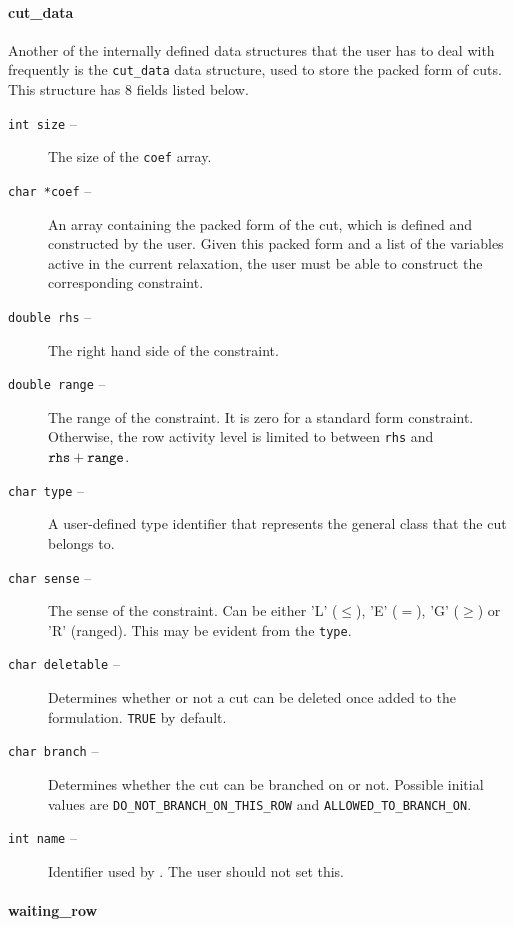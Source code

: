 \begin{description}
\begin{htmlonly}
\paragraph{cut\_data}
\end{htmlonly}
\label{cut_data}

Another of the internally defined data structures that the user has to
deal with frequently is the {\tt cut\_data} data structure, used to
store the packed form of cuts. This structure has 8 fields listed
below.
\begin{description}
\item [{\tt int size} --] The size of the {\tt coef} array.
\item [{\tt char *coef} --] An array containing the packed form of the
cut, which is defined and constructed by the user. Given this packed
form and a list of the variables active in the current relaxation, the
user must be able to construct the corresponding constraint.
\item [{\tt double rhs} --] The right hand side of the constraint.
\item [{\tt double range} --] The range of the constraint. It is zero for
a standard form constraint. Otherwise, the row activity level is
limited to between {\tt rhs} and ${\tt rhs}+{\tt range}$.
\item [{\tt char type} --] A user-defined type identifier that represents the
general class that the cut belongs to.
\item [{\tt char sense} --] The sense of the constraint. Can be either 'L' 
($\leq$), 'E' ($=$), 'G' ($\geq$) or 'R' (ranged). This may be evident
from the {\tt type}.
\item [{\tt char deletable} --] Determines whether or not a cut can be
deleted once added to the formulation. {\tt TRUE} by default.
\item [{\tt char branch} --] Determines whether the cut can be branched
on or not. Possible initial values are {\tt DO\_NOT\_BRANCH\_ON\_THIS\_ROW}
and {\tt ALLOWED\_TO\_BRANCH\_ON}.
\item [{\tt int name} --] Identifier used by \BB. The user should not
set this.
\end{description}

\begin{htmlonly}
\paragraph{waiting\_row}
\label{waiting_row}
\end{htmlonly}


\end{description}
